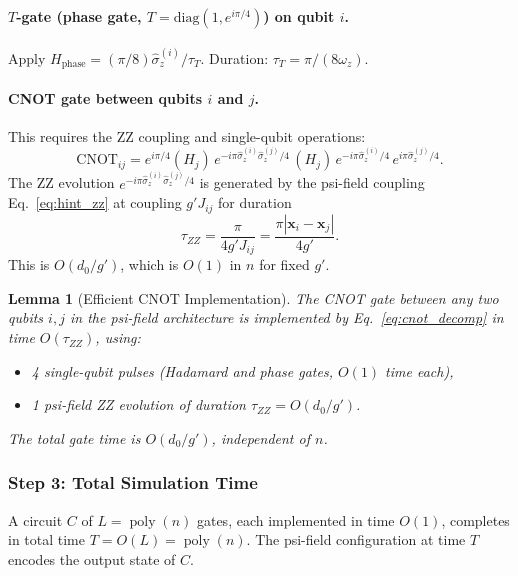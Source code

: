 \documentclass[11pt]{article}
\newtheorem{lemma}[theorem]{Lemma}
\theoremstyle{definition}
\theoremstyle{remark}
\DeclareMathOperator{\poly}{poly}
\begin{document}
\paragraph{$T$-gate (phase gate, $T = \mathrm{diag}(1, e^{i\pi/4})$) on qubit $i$.}
Apply $H_{\mathrm{phase}} = (\pi/8)\hat{\sigma}_z^{(i)}/\tau_T$.
Duration: $\tau_T = \pi/(8\omega_z)$.

\paragraph{CNOT gate between qubits $i$ and $j$.}
This requires the ZZ coupling and single-qubit operations:
\begin{equation}
\mathrm{CNOT}_{ij} = e^{i\pi/4}(H_j)\,e^{-i\pi\hat{\sigma}_z^{(i)}\hat{\sigma}_z^{(j)}/4}
\,(H_j)\,e^{-i\pi\hat{\sigma}_z^{(i)}/4}\,e^{i\pi\hat{\sigma}_z^{(j)}/4}.
\label{eq:cnot_decomp}
\end{equation}
The ZZ evolution $e^{-i\pi\hat{\sigma}_z^{(i)}\hat{\sigma}_z^{(j)}/4}$
is generated by the psi-field coupling Eq.~\eqref{eq:hint_zz} at coupling
$g' J_{ij}$ for duration
\begin{equation}
\tau_{ZZ} = \frac{\pi}{4 g' J_{ij}} = \frac{\pi |\mathbf{x}_i - \mathbf{x}_j|}{4 g'}.
\label{eq:tau_zz}
\end{equation}
This is $O(d_0/g')$, which is $O(1)$ in $n$ for fixed $g'$.

\begin{lemma}[Efficient CNOT Implementation]
\label{lem:cnot}
The CNOT gate between any two qubits $i,j$ in the psi-field architecture
is implemented by Eq.~\eqref{eq:cnot_decomp} in time $O(\tau_{ZZ})$,
using:
\begin{itemize}[nosep]
\item 4 single-qubit pulses (Hadamard and phase gates, $O(1)$ time each),
\item 1 psi-field ZZ evolution of duration $\tau_{ZZ} = O(d_0/g')$.
\end{itemize}
The total gate time is $O(d_0/g')$, independent of $n$.
\end{lemma}

\subsubsection{Step 3: Total Simulation Time}

A circuit $C$ of $L = \poly(n)$ gates, each implemented in time $O(1)$,
completes in total time $T = O(L) = \poly(n)$. The psi-field configuration
at time $T$ encodes the output state of $C$.
\end{document}
